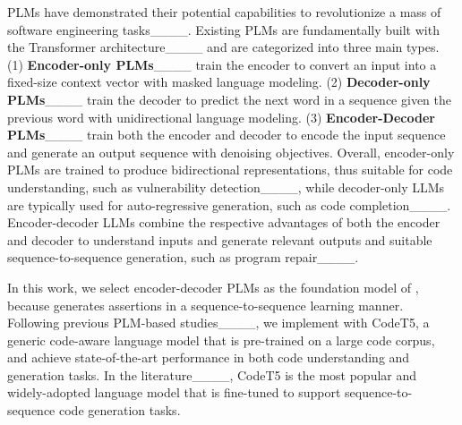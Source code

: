 PLMs have demonstrated their potential capabilities to revolutionize a mass of software engineering tasks____.
Existing PLMs are fundamentally built with the Transformer architecture____ and are categorized into three main types.
(1) \textbf{Encoder-only PLMs}____ train the encoder to convert an input into a fixed-size context vector with masked language modeling.
(2) \textbf{Decoder-only PLMs}____ train the decoder to predict the next word in a sequence given the previous word with unidirectional language modeling.
(3) \textbf{Encoder-Decoder PLMs}____ train both the encoder and decoder to encode the input sequence and generate an output sequence with denoising objectives.
Overall, encoder-only PLMs are trained to produce bidirectional representations, thus suitable for code understanding, such as vulnerability detection____, while decoder-only LLMs are typically used for auto-regressive generation, such as code completion____.
Encoder-decoder LLMs combine the respective advantages of both the encoder and decoder to understand inputs and generate relevant outputs and suitable sequence-to-sequence generation, such as program repair____.

In this work, we select encoder-decoder PLMs as the foundation model of \toolname{}, because \toolname{} generates assertions in a sequence-to-sequence learning manner.
Following previous PLM-based studies____, we implement \toolname{} with CodeT5, a generic code-aware language model that is pre-trained on a large code corpus, and achieve state-of-the-art performance in both code understanding and generation tasks.
In the literature____, CodeT5 is the most popular and widely-adopted language model that is fine-tuned to support sequence-to-sequence code generation tasks.


\subsection{}
\label{sec:background_IR}

